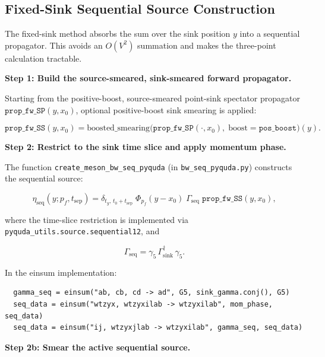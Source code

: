 \documentclass[11pt,a4paper]{article}
\newcommand{\code}[1]{\texttt{#1}}
\begin{document}
\subsection{Fixed-Sink Sequential Source Construction}
\label{sec:seq_src}

The fixed-sink method absorbs the sum over the sink position $y$ into a sequential propagator. This avoids an $O(V^2)$ summation and makes the three-point calculation tractable.

\textbf{Step 1: Build the source-smeared, sink-smeared forward propagator.}

Starting from the positive-boost, source-smeared point-sink spectator
propagator $\mathtt{prop\_fw\_SP}(y, x_0)$, optional positive-boost sink
smearing is applied:

\begin{equation}
  \mathtt{prop\_fw\_SS}(y, x_0)
    = \text{boosted\_smearing}\big(
        \mathtt{prop\_fw\_SP}(\cdot, x_0),\;
        \text{boost} = \mathtt{pos\_boost}
      \big)(y).
\end{equation}

\textbf{Step 2: Restrict to the sink time slice and apply momentum phase.}

The function \code{create\_meson\_bw\_seq\_pyquda} (in \code{bw\_seq\_pyquda.py}) constructs the sequential source:

\begin{equation}\label{eq:eta_seq}
  \eta_{\text{seq}}(y; p_f, t_{\text{sep}})
    = \delta_{t_y,\, t_0 + t_{\text{sep}}}\;
      \Phi_{p_f}(y - x_0)\;
      \Gamma_{\text{seq}}\;
      \mathtt{prop\_fw\_SS}(y, x_0),
\end{equation}

where the time-slice restriction is implemented via \code{pyquda\_utils.source.sequential12}, and

\begin{equation}\label{eq:Gamma_seq}
  \Gamma_{\text{seq}} = \gamma_5\, \Gamma_{\text{sink}}^\dagger\, \gamma_5.
\end{equation}

In the einsum implementation:
\begin{verbatim}
  gamma_seq = einsum("ab, cb, cd -> ad", G5, sink_gamma.conj(), G5)
  seq_data = einsum("wtzyx, wtzyxilab -> wtzyxilab", mom_phase, seq_data)
  seq_data = einsum("ij, wtzyxjlab -> wtzyxilab", gamma_seq, seq_data)
\end{verbatim}

\textbf{Step 2b: Smear the active sequential source.}
\end{document}
